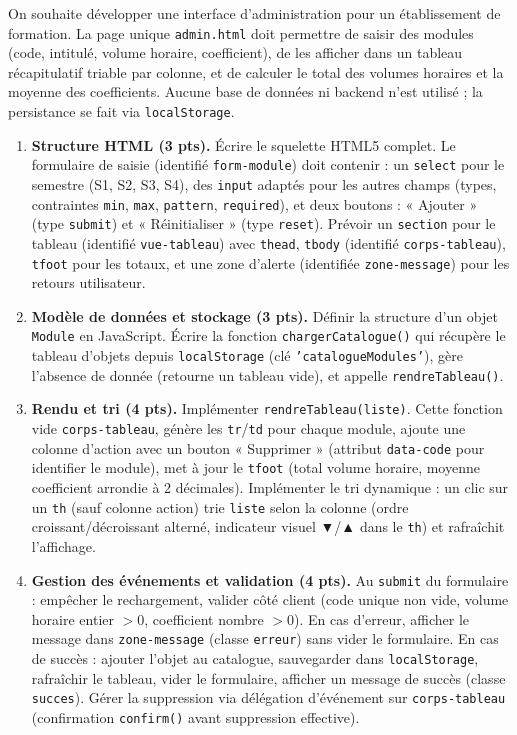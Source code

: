 \documentclass[11pt]{article}
\begin{document}
\begin{exercice}
On souhaite développer une interface d'administration pour un établissement de formation. La page unique \texttt{admin.html} doit permettre de saisir des modules (code, intitulé, volume horaire, coefficient), de les afficher dans un tableau récapitulatif triable par colonne, et de calculer le total des volumes horaires et la moyenne des coefficients. Aucune base de données ni backend n'est utilisé ; la persistance se fait via \texttt{localStorage}.

\begin{enumerate}
    \item \textbf{Structure HTML (3 pts).} Écrire le squelette HTML5 complet. Le formulaire de saisie (identifié \texttt{form-module}) doit contenir : un \texttt{select} pour le semestre (S1, S2, S3, S4), des \texttt{input} adaptés pour les autres champs (types, contraintes \texttt{min}, \texttt{max}, \texttt{pattern}, \texttt{required}), et deux boutons : « Ajouter » (type \texttt{submit}) et « Réinitialiser » (type \texttt{reset}). Prévoir un \texttt{section} pour le tableau (identifié \texttt{vue-tableau}) avec \texttt{thead}, \texttt{tbody} (identifié \texttt{corps-tableau}), \texttt{tfoot} pour les totaux, et une zone d'alerte (identifiée \texttt{zone-message}) pour les retours utilisateur.
    \item \textbf{Modèle de données et stockage (3 pts).} Définir la structure d'un objet \texttt{Module} en JavaScript. Écrire la fonction \texttt{chargerCatalogue()} qui récupère le tableau d'objets depuis \texttt{localStorage} (clé \texttt{'catalogueModules'}), gère l'absence de donnée (retourne un tableau vide), et appelle \texttt{rendreTableau()}.
    \item \textbf{Rendu et tri (4 pts).} Implémenter \texttt{rendreTableau(liste)}. Cette fonction vide \texttt{corps-tableau}, génère les \texttt{tr}/\texttt{td} pour chaque module, ajoute une colonne d'action avec un bouton « Supprimer » (attribut \texttt{data-code} pour identifier le module), met à jour le \texttt{tfoot} (total volume horaire, moyenne coefficient arrondie à 2 décimales). Implémenter le tri dynamique : un clic sur un \texttt{th} (sauf colonne action) trie \texttt{liste} selon la colonne (ordre croissant/décroissant alterné, indicateur visuel ▼/▲ dans le \texttt{th}) et rafraîchit l'affichage.
    \item \textbf{Gestion des événements et validation (4 pts).} Au \texttt{submit} du formulaire : empêcher le rechargement, valider côté client (code unique non vide, volume horaire entier $>0$, coefficient nombre $>0$). En cas d'erreur, afficher le message dans \texttt{zone-message} (classe \texttt{erreur}) sans vider le formulaire. En cas de succès : ajouter l'objet au catalogue, sauvegarder dans \texttt{localStorage}, rafraîchir le tableau, vider le formulaire, afficher un message de succès (classe \texttt{succes}). Gérer la suppression via délégation d'événement sur \texttt{corps-tableau} (confirmation \texttt{confirm()} avant suppression effective).

\end{enumerate}
\end{exercice}
\end{document}
